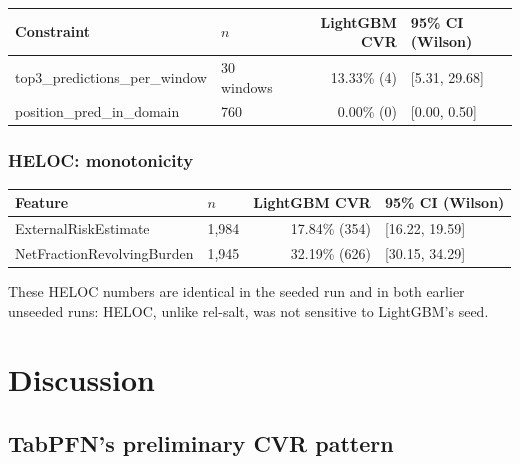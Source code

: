 \documentclass[11pt]{article}
\begin{document}
\begin{table}[h]
\centering
\small
\begin{tabular}{@{} l l r l @{}}
\toprule
\textbf{Constraint} & \textbf{$n$} & \textbf{LightGBM CVR} & \textbf{95\% CI (Wilson)} \\
\midrule
top3\_predictions\_per\_window & 30 windows & 13.33\% (4) & [5.31, 29.68] \\
position\_pred\_in\_domain & 760 & 0.00\% (0) & [0.00, 0.50] \\
\bottomrule
\end{tabular}
\end{table}

\subsubsection{HELOC: monotonicity}

\begin{table}[h]
\centering
\small
\begin{tabular}{@{} l l r l @{}}
\toprule
\textbf{Feature} & \textbf{$n$} & \textbf{LightGBM CVR} & \textbf{95\% CI (Wilson)} \\
\midrule
ExternalRiskEstimate & 1{,}984 & 17.84\% (354) & [16.22, 19.59] \\
NetFractionRevolvingBurden & 1{,}945 & 32.19\% (626) & [30.15, 34.29] \\
\bottomrule
\end{tabular}
\end{table}

These HELOC numbers are identical in the seeded run and in both earlier unseeded runs: HELOC,
unlike rel-salt, was not sensitive to LightGBM's seed.

\section{Discussion}
\label{sec:discussion}

\subsection{TabPFN's preliminary CVR pattern}
\end{document}
